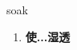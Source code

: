 
\begin{frame}
{\huge soak}
\begin{center}
\begin{enumerate}\Large
  \item \textbf{使...湿透}
\end{enumerate}
\end{center}
\end{frame}
